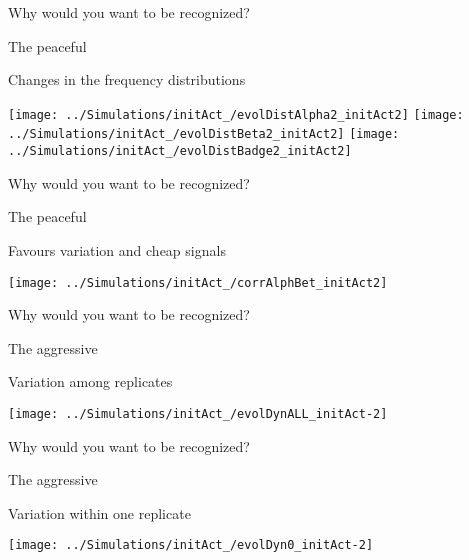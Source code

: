 \documentclass[
  ignorenonframetext,
]{beamer}
\begin{document}
\begin{frame}{Why would you want to be recognized?}
\protect\hypertarget{why-would-you-want-to-be-recognized-3}{}

\begin{block}{The peaceful}

Changes in the frequency distributions

\begin{flushleft}\texttt{[image: ../Simulations/initAct\_/evolDistAlpha2\_initAct2]} \texttt{[image: ../Simulations/initAct\_/evolDistBeta2\_initAct2]} \texttt{[image: ../Simulations/initAct\_/evolDistBadge2\_initAct2]} \end{flushleft}

\end{block}

\end{frame}

\begin{frame}{Why would you want to be recognized?}
\protect\hypertarget{why-would-you-want-to-be-recognized-4}{}

\begin{block}{The peaceful}

Favours variation and cheap signals

\begin{flushleft}\texttt{[image: ../Simulations/initAct\_/corrAlphBet\_initAct2]} \end{flushleft}

\end{block}

\end{frame}

\begin{frame}{Why would you want to be recognized?}
\protect\hypertarget{why-would-you-want-to-be-recognized-5}{}

\begin{block}{The aggressive}

Variation among replicates

\begin{flushleft}\texttt{[image: ../Simulations/initAct\_/evolDynALL\_initAct-2]} \end{flushleft}

\end{block}

\end{frame}

\begin{frame}{Why would you want to be recognized?}
\protect\hypertarget{why-would-you-want-to-be-recognized-6}{}

\begin{block}{The aggressive}

Variation within one replicate

\begin{flushleft}\texttt{[image: ../Simulations/initAct\_/evolDyn0\_initAct-2]} \end{flushleft}

\end{block}

\end{frame}
\end{document}
